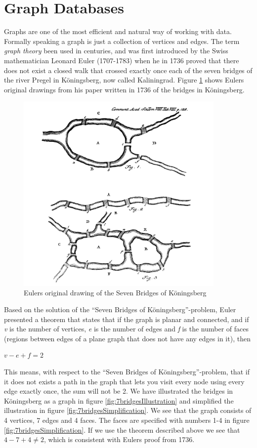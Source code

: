 \section{Graph Databases}

Graphs are one of the most efficient and natural way of working with data. Formally speaking a graph is just a collection of vertices and edges. The term \textit{graph theory} been used in centuries, and was first introduced by the Swiss mathematician Leonard Euler (1707-1783) when he in 1736 proved that there does not exist a closed walk that crossed exactly once each of the seven bridges of the river Pregel in Köningsberg, now called Kaliningrad\citep{alexanderson06}. Figure \ref{fig:7bridgesEuler} shows Eulers original drawings from his paper written in 1736 \citep{euler1741} of the bridges in Köningsberg. 

\begin{figure}[H]
  \centering
  \includegraphics[width=4in]{assets/7bridges-euler.png}
  \caption{Eulers original drawing of the Seven Bridges of Köningsberg} 
  \label{fig:7bridgesEuler}
\end{figure}

Based on the solution of the ``Seven Bridges of Köningsberg''-problem, Euler presented a theorem that states that if the graph is planar and connected, and if \textit{v} is the number of vertices, \textit{e} is the number of edges and \textit{f} is the number of faces (regions between edges of a plane graph that does not have any edges in it), then 
\newline
\newline
\centerline{$v-e+f=2$}
\newline
\newline
This means, with respect to the ``Seven Bridges of Köningsberg''-problem, that if it does not exists a path in the graph that lets you visit every node using every edge exactly once, the sum will not be 2. We have illustrated the bridges in Köningsberg as a graph in figure \ref{fig:7bridgesIllustration} and simplified the illustration in figure \ref{fig:7bridgesSimplification}. We see that the graph consists of 4 vertices, 7 edges and 4 faces. The faces are specified with numbers 1-4 in figure \ref{fig:7bridgesSimplification}. If we use the theorem described above we see that $4-7+4\neq2$, which is consistent with Eulers proof from 1736. 

